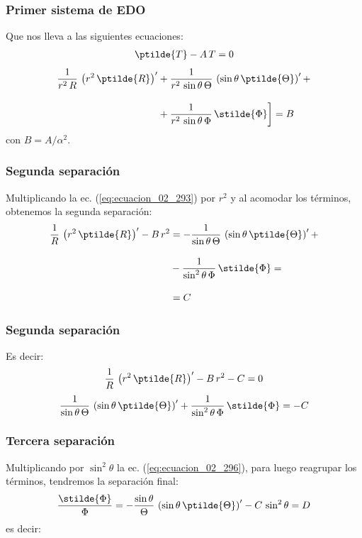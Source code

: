 \begin{frame}
\frametitle{Primer sistema de EDO}
Que nos lleva a las siguientes ecuaciones:
\begin{align}
\ptilde{T} - A \, T = 0
\label{eq:ecuacion_02_292}
\end{align}
\begin{align}
\begin{aligned}
\dfrac{1}{r^{2} \, R} \, \left( r^{2} \, \ptilde{R} \right)^{\prime} &+ \dfrac{1}{r^{2} \, \sin \theta \, \Theta} \, \left( \sin \theta \, \ptilde{\Theta} \right)^{\prime} + \\[1em]
&+ \dfrac{1}{r^{2} \, \sin \theta \, \Phi} \, \stilde{\Phi} \bigg] = B
\end{aligned}
\label{eq:ecuacion_02_293}
\end{align}
con $B = A / \alpha^{2}$.
\end{frame}
\begin{frame}
\frametitle{Segunda separación}
Multiplicando la ec. (\ref{eq:ecuacion_02_293}) por $r^{2}$ y al acomodar los términos, obtenemos la segunda separación:
\begin{align}
\begin{aligned}
\dfrac{1}{R} \, \left( r^{2} \, \ptilde{R} \right)^{\prime} - B \, r^{2} &=  - \dfrac{1}{\sin \theta \, \Theta} \, \left( \sin \theta \, \ptilde{\Theta} \right)^{\prime} + \\[1em]
&- \dfrac{1}{\sin^{2} \theta \, \Phi} \, \stilde{\Phi} = \\[1em]
&= C
\end{aligned}
\label{eq:ecuacion_02_294}
\end{align}
\end{frame}
\begin{frame}
\frametitle{Segunda separación}
Es decir:
\begin{align}
\dfrac{1}{R} \, \left( r^{2} \, \ptilde{R} \right)^{\prime} - B \, r^{2} - C = 0
\label{eq:ecuacion_02_295}
\end{align}
\begin{align}
\dfrac{1}{\sin \theta \, \Theta} \, \left( \sin \theta \, \ptilde{\Theta} \right)^{\prime} + \dfrac{1}{\sin^{2} \theta \, \Phi} \, \stilde{\Phi} = - C
\label{eq:ecuacion_02_296}
\end{align}
\end{frame}
\begin{frame}
\frametitle{Tercera separación}
Multiplicando por $\sin^{2} \theta$ la ec. (\ref{eq:ecuacion_02_296}), para luego reagrupar los términos, tendremos la separación final:
\begin{align}
\dfrac{\stilde{\Phi}}{\Phi} = - \dfrac{\sin \theta}{\Theta} \, \left( \sin \theta \, \ptilde{\Theta} \right)^{\prime} - C \, \sin^{2} \theta = D
\label{eq:ecuacion_02_297}
\end{align}
es decir:
\end{frame}
